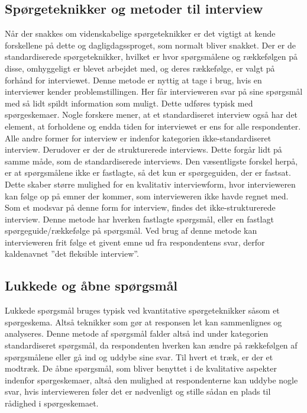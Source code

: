 \subsection{Spørgeteknikker og metoder til interview}
Når der snakkes om videnskabelige spørgeteknikker er det vigtigt at kende forskellene på dette og dagligdagssproget, som normalt bliver snakket. Der er de standardiserede spørgeteknikker, hvilket er hvor spørgsmålene og rækkefølgen på disse, omhyggeligt er blevet arbejdet med, og deres rækkefølge, er valgt på forhånd for interviewet. Denne metode er nyttig at tage i brug, hvis en interviewer kender problemstillingen. Her får intervieweren svar på sine spørgsmål med så lidt spildt information som muligt. Dette udføres typisk med spørgeskemaer. Nogle forskere mener, at et standardiseret interview også har det element, at forholdene og endda tiden for interviewet er ens for alle respondenter. Alle andre former for interview er indenfor kategorien ikke-standardiseret interview.
Derudover er der de strukturerede interviews. Dette forgår lidt på samme måde, som de standardiserede interviews. Den væsentligste forskel herpå, er at spørgsmålene ikke er fastlagte, så det kun er spørgeguiden, der er fastsat. Dette skaber større mulighed for en kvalitativ interviewform, hvor intervieweren kan følge op på emner der kommer, som intervieweren ikke havde regnet med. Som et modsvar på denne form for interview, findes det ikke-strukturerede interview. Denne metode har hverken fastlagte spørgsmål, eller en fastlagt spørgeguide/rækkefølge på spørgsmål. Ved brug af denne metode kan intervieweren frit følge et givent emne ud fra respondentens svar, derfor kaldenavnet  ”det fleksible interview”.\newline
 
\subsection{Lukkede og åbne spørgsmål}
Lukkede spørgsmål bruges typisk ved kvantitative spørgeteknikker såsom et spørgeskema. Altså teknikker som gør at responsen let kan sammenlignes og analyseres. Denne metode af spørgsmål falder altså ind under kategorien standardiseret spørgsmål, da respondenten hverken kan ændre på rækkefølgen af spørgsmålene eller gå ind og uddybe sine svar. 
Til hvert et træk, er der et modtræk. De åbne spørgsmål, som bliver benyttet i de kvalitative aspekter indenfor spørgeskemaer, altså den mulighed at respondenterne kan uddybe nogle svar, hvis intervieweren føler det er nødvenligt og stille sådan en plads til rådighed i spørgeskemaet. \citep{metodeogprojektskrivning}\newline

